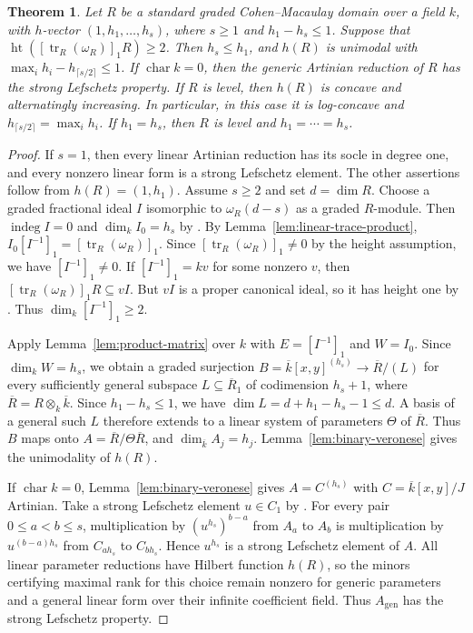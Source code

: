 \documentclass[a4paper,11pt]{amsart}
\DeclareMathOperator{\tr}{tr}
\DeclareMathOperator{\indeg}{indeg}
\DeclareMathOperator{\height}{ht}
\newcommand{\kk}{k}
\newtheorem{theorem}{Theorem}[section]
\theoremstyle{definition}
\begin{document}
\begin{theorem}\label{thm:height-unimodality}
Let $R$ be a standard graded Cohen--Macaulay domain over a field $\kk$, with $h$-vector $(1,h_1,\ldots,h_s)$, where $s\geq1$ and $h_1-h_s\leq1$. Suppose that $\height([\tr_R(\omega_R)]_1R)\geq2$. Then $h_s\leq h_1$, and $h(R)$ is unimodal with $\max_i h_i-h_{\lceil s/2\rceil}\leq1$. If $\operatorname{char}\kk=0$, then the generic Artinian reduction of $R$ has the strong Lefschetz property. If $R$ is level, then $h(R)$ is concave and alternatingly increasing. In particular, in this case it is log-concave and $h_{\lceil s/2\rceil}=\max_i h_i$. If $h_1=h_s$, then $R$ is level and $h_1=\cdots=h_s$.
\end{theorem}
\begin{proof}
If $s=1$, then every linear Artinian reduction has its socle in degree one, and every nonzero linear form is a strong Lefschetz element. The other assertions follow from $h(R)=(1,h_1)$. Assume $s\geq2$ and set $d=\dim R$. Choose a graded fractional ideal $I$ isomorphic to $\omega_R(d-s)$ as a graded $R$-module. Then $\indeg I=0$ and $\dim_{\kk}I_0=h_s$ by \cite[Corollary~4.4.6~(a)]{BH98}. By Lemma~\ref{lem:linear-trace-product}, $I_0[I^{-1}]_1=[\tr_R(\omega_R)]_1$. Since $[\tr_R(\omega_R)]_1\ne0$ by the height assumption, we have $[I^{-1}]_1\ne0$. If $[I^{-1}]_1=\kk v$ for some nonzero $v$, then $[\tr_R(\omega_R)]_1R\subseteq vI$. But $vI$ is a proper canonical ideal, so it has height one by \cite[Proposition~3.3.18~(b)]{BH98}. Thus $\dim_{\kk}[I^{-1}]_1\geq2$.

Apply Lemma~\ref{lem:product-matrix} over $\kk$ with $E=[I^{-1}]_1$ and $W=I_0$. Since $\dim_{\kk}W=h_s$, we obtain a graded surjection $B=\overline{\kk}[x,y]^{(h_s)}\longrightarrow\overline R/(L)$ for every sufficiently general subspace $L\subseteq\overline R_1$ of codimension $h_s+1$, where $\overline R=R\otimes_{\kk}\overline{\kk}$. Since $h_1-h_s\leq1$, we have $\dim L=d+h_1-h_s-1\leq d$. A basis of a general such $L$ therefore extends to a linear system of parameters $\Theta$ of $\overline R$. Thus $B$ maps onto $A=\overline R/\Theta\overline R$, and $\dim_{\overline{\kk}} A_j=h_j$. Lemma~\ref{lem:binary-veronese} gives the unimodality of $h(R)$.

If $\operatorname{char}\kk=0$, Lemma~\ref{lem:binary-veronese} gives $A=C^{(h_s)}$ with $C=\overline{\kk}[x,y]/J$ Artinian. Take a strong Lefschetz element $u\in C_1$ by \cite[Proposition~4.4]{HMNW03}. For every pair $0\le a<b\le s$, multiplication by $(u^{h_s})^{b-a}$ from $A_a$ to $A_b$ is multiplication by $u^{(b-a)h_s}$ from $C_{a h_s}$ to $C_{b h_s}$. Hence $u^{h_s}$ is a strong Lefschetz element of $A$. All linear parameter reductions have Hilbert function $h(R)$, so the minors certifying maximal rank for this choice remain nonzero for generic parameters and a general linear form over their infinite coefficient field. Thus $A_{\mathrm{gen}}$ has the strong Lefschetz property.


\end{proof}
\end{document}
